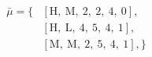 \begin{equation}
\nonumber
\begin{aligned}
\bar{\mu} = \{  & \left[\text{H}, \ \text{M}, \ \text{2}, \ \text{2}, \ \text{4}, \ \text{0}\right], \\  & \left[\text{H}, \ \text{L}, \ \text{4}, \ \text{5}, \ \text{4}, \ \text{1}\right], \\  & \left[\text{M}, \ \text{M}, \ \text{2}, \ \text{5}, \ \text{4}, \ \text{1}\right], \} \\ 
\end{aligned}
\end{equation} \\ 